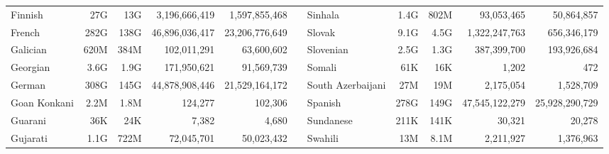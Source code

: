 \begin{table*}[t!]
{\begin{tabular}{@{}lrrrrclrrrr@{}}
            Finnish                   & 27G                      & 13G                       & 3,196,666,419            & 1,597,855,468             &                          & Sinhala                   & 1.4G                     & 802M                      & 93,053,465               & 50,864,857                \\
            French                    & 282G                     & 138G                      & 46,896,036,417           & 23,206,776,649            &                          & Slovak                    & 9.1G                     & 4.5G                      & 1,322,247,763            & 656,346,179               \\
            Galician                  & 620M                     & 384M                      & 102,011,291              & 63,600,602                &                          & Slovenian                 & 2.5G                     & 1.3G                      & 387,399,700              & 193,926,684               \\
            Georgian                  & 3.6G                     & 1.9G                      & 171,950,621              & 91,569,739                &                          & Somali                    & 61K                      & 16K                       & 1,202                    & 472                       \\
            German                    & 308G                     & 145G                      & 44,878,908,446           & 21,529,164,172            &                          & South Azerbaijani         & 27M                      & 19M                       & 2,175,054                & 1,528,709                 \\
            Goan Konkani              & 2.2M                     & 1.8M                      & 124,277                  & 102,306                   &                          & Spanish                   & 278G                     & 149G                      & 47,545,122,279           & 25,928,290,729            \\
            Guarani                   & 36K                      & 24K                       & 7,382                    & 4,680                     &                          & Sundanese                 & 211K                     & 141K                      & 30,321                   & 20,278                    \\
            Gujarati                  & 1.1G                     & 722M                      & 72,045,701               & 50,023,432                &                          & Swahili                   & 13M                      & 8.1M                      & 2,211,927                & 1,376,963                 \\

\end{tabular}}
\end{table*}
